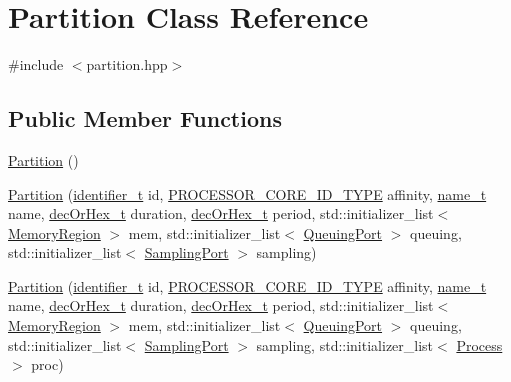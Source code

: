 \hypertarget{classPartition}{}\section{Partition Class Reference}
\label{classPartition}


{\ttfamily \#include $<$partition.\+hpp$>$}

\subsection*{Public Member Functions}
\begin{DoxyCompactItemize}
\item 
\hyperlink{classPartition_aa8a055cfc129cee2a2ef024556fb6c0d}{Partition} ()
\item 
\hyperlink{classPartition_aa107f9e018df969f66596e35cef04aba}{Partition} (\hyperlink{general__types_8hpp_a824b78b06da8112c2772bc666a63638d}{identifier\+\_\+t} id, \hyperlink{apex__types_8h_ac081e44ca764e4d769f88a7f3bbc60de}{P\+R\+O\+C\+E\+S\+S\+O\+R\+\_\+\+C\+O\+R\+E\+\_\+\+I\+D\+\_\+\+T\+Y\+PE} affinity, \hyperlink{structname__t}{name\+\_\+t} name, \hyperlink{general__types_8hpp_a0edc3a86ddf4aa205c6882b61cd7b4e9}{dec\+Or\+Hex\+\_\+t} duration, \hyperlink{general__types_8hpp_a0edc3a86ddf4aa205c6882b61cd7b4e9}{dec\+Or\+Hex\+\_\+t} period, std\+::initializer\+\_\+list$<$ \hyperlink{classMemoryRegion}{Memory\+Region} $>$ mem, std\+::initializer\+\_\+list$<$ \hyperlink{classQueuingPort}{Queuing\+Port} $>$ queuing, std\+::initializer\+\_\+list$<$ \hyperlink{classSamplingPort}{Sampling\+Port} $>$ sampling)
\item 
\hyperlink{classPartition_ae7720ab349b46291bacc1a596dee2cd3}{Partition} (\hyperlink{general__types_8hpp_a824b78b06da8112c2772bc666a63638d}{identifier\+\_\+t} id, \hyperlink{apex__types_8h_ac081e44ca764e4d769f88a7f3bbc60de}{P\+R\+O\+C\+E\+S\+S\+O\+R\+\_\+\+C\+O\+R\+E\+\_\+\+I\+D\+\_\+\+T\+Y\+PE} affinity, \hyperlink{structname__t}{name\+\_\+t} name, \hyperlink{general__types_8hpp_a0edc3a86ddf4aa205c6882b61cd7b4e9}{dec\+Or\+Hex\+\_\+t} duration, \hyperlink{general__types_8hpp_a0edc3a86ddf4aa205c6882b61cd7b4e9}{dec\+Or\+Hex\+\_\+t} period, std\+::initializer\+\_\+list$<$ \hyperlink{classMemoryRegion}{Memory\+Region} $>$ mem, std\+::initializer\+\_\+list$<$ \hyperlink{classQueuingPort}{Queuing\+Port} $>$ queuing, std\+::initializer\+\_\+list$<$ \hyperlink{classSamplingPort}{Sampling\+Port} $>$ sampling, std\+::initializer\+\_\+list$<$ \hyperlink{classProcess}{Process} $>$ proc)
\item 

\end{DoxyCompactItemize}
